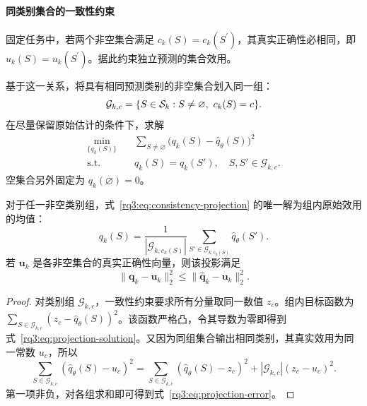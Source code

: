 \paragraph{同类别集合的一致性约束}
固定任务中，若两个非空集合满足 $c_k(S)=c_k(S^{\prime})$，其真实正确性必相同，即 $u_k(S)=u_k(S^{\prime})$。据此约束独立预测的集合效用。

基于这一关系，将具有相同预测类别的非空集合划入同一组：
\begin{equation}
  \mathcal G_{k,c}=\{S\in\mathcal{S}_k:S\ne\varnothing,\ c_k(S)=c\}.
  \label{rq3:eq:class-groups}
\end{equation}
在尽量保留原始估计的条件下，求解
\begin{equation}
  \begin{aligned}
    \min_{\{q_k(S)\}}\quad &\sum_{S\ne\varnothing}
       \bigl(q_k(S)-\hat q_\theta(S)\bigr)^2\\
    \mathrm{s.t.}\quad &q_k(S)=q_k(S'),\quad S,S'\in\mathcal G_{k,c}.
  \end{aligned}
  \label{rq3:eq:consistency-projection}
\end{equation}
空集合另外固定为 $q_k(\varnothing)=0$。

\begin{proposition}[一致性投影的闭式解与误差性质]
\label{rq3:prop:projection}
对于任一非空类别组，式~\eqref{rq3:eq:consistency-projection} 的唯一解为组内原始效用的均值：
\begin{equation}
  q_k(S)=\frac{1}{|\mathcal G_{k,c_k(S)}|}
    \sum_{S'\in\mathcal G_{k,c_k(S)}}\hat q_\theta(S').
  \label{rq3:eq:projection-solution}
\end{equation}
若 $\bm u_k$ 是各非空集合的真实正确性向量，则该投影满足
\begin{equation}
  \|\bm q_k-\bm u_k\|_2^2
  \le\|\widehat{\bm q}_k-\bm u_k\|_2^2.
  \label{rq3:eq:projection-error}
\end{equation}
\end{proposition}

\begin{proof}
对类别组 $\mathcal G_{k,c}$，一致性约束要求所有分量取同一数值 $z_c$。组内目标函数为 $\sum_{S\in\mathcal G_{k,c}}(z_c-\hat q_\theta(S))^2$。该函数严格凸，令其导数为零即得到式~\eqref{rq3:eq:projection-solution}。又因为同组集合输出相同类别，其真实效用为同一常数 $u_c$，所以
\begin{equation}
  \sum_{S\in\mathcal G_{k,c}}(\hat q_\theta(S)-u_c)^2
  =\sum_{S\in\mathcal G_{k,c}}(\hat q_\theta(S)-z_c)^2
   +|\mathcal G_{k,c}|(z_c-u_c)^2.
  \label{rq3:eq:projection-decomposition}
\end{equation}
第一项非负，对各组求和即可得到式~\eqref{rq3:eq:projection-error}。
\end{proof}

